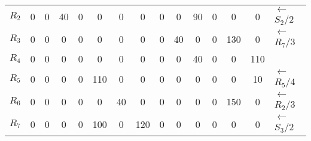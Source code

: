 \documentclass[12pt]{article}
\begin{document}
\begin{enumerate}
\begin{tabular}{|c|c|c|c|c|c|c|c|c|c|c|c|c|c|l}
$R_2$ & 0   & {\color[HTML]{000000} 0}        & {\color[HTML]{000000} 40}       & {\color[HTML]{000000} 0}        & {\color[HTML]{000000} 0}   & {\color[HTML]{000000} 0}   & {\color[HTML]{000000} 0}   & {\color[HTML]{000000} 0}  & {\color[HTML]{000000} 0}   & {\color[HTML]{FE0000} 90} & {\color[HTML]{000000} 0}   & {\color[HTML]{000000} 0}   & {\color[HTML]{000000} 0}   & ${\leftarrow}$ $S_2$/2 \\ \cline{1-14}
$R_3$ & 0   & {\color[HTML]{000000} 0}        & {\color[HTML]{000000} 0}        & {\color[HTML]{000000} 0}        & {\color[HTML]{000000} 0}   & {\color[HTML]{000000} 0}   & {\color[HTML]{000000} 0}   & {\color[HTML]{000000} 0}  & {\color[HTML]{000000} 40}  & {\color[HTML]{000000} 0}  & {\color[HTML]{000000} 0}   & {\color[HTML]{000000} 130} & {\color[HTML]{000000} 0}   & ${\leftarrow}$ $R_7$/3 \\ \cline{1-14}
$R_4$ & 0   & {\color[HTML]{000000} 0}        & {\color[HTML]{000000} 0}        & {\color[HTML]{000000} 0}        & {\color[HTML]{000000} 0}   & {\color[HTML]{000000} 0}   & {\color[HTML]{000000} 0}   & {\color[HTML]{000000} 0}  & {\color[HTML]{000000} 0}   & {\color[HTML]{000000} 40} & {\color[HTML]{000000} 0}   & {\color[HTML]{000000} 0}   & {\color[HTML]{000000} 110} &                        \\ \cline{1-14}
$R_5$ & 0   & {\color[HTML]{000000} 0}        & {\color[HTML]{000000} 0}        & {\color[HTML]{000000} 0}        & {\color[HTML]{000000} 110} & {\color[HTML]{000000} 0}   & {\color[HTML]{000000} 0}   & {\color[HTML]{000000} 0}  & {\color[HTML]{000000} 0}   & {\color[HTML]{000000} 0}  & {\color[HTML]{000000} 0}   & {\color[HTML]{000000} 0}   & {\color[HTML]{000000} 10}  & ${\leftarrow}$ $R_5$/4 \\ \cline{1-14}
$R_6$ & 0   & {\color[HTML]{000000} 0}        & {\color[HTML]{000000} 0}        & {\color[HTML]{000000} 0}        & {\color[HTML]{000000} 0}   & {\color[HTML]{000000} 40}  & {\color[HTML]{000000} 0}   & {\color[HTML]{000000} 0}  & {\color[HTML]{000000} 0}   & {\color[HTML]{000000} 0}  & {\color[HTML]{000000} 0}   & {\color[HTML]{FE0000} 150} & {\color[HTML]{000000} 0}   & ${\leftarrow}$ $R_2$/3 \\ \cline{1-14}
$R_7$ & 0   & {\color[HTML]{000000} 0}        & {\color[HTML]{000000} 0}        & {\color[HTML]{000000} 0}        & {\color[HTML]{000000} 100} & {\color[HTML]{000000} 0}   & {\color[HTML]{000000} 120} & {\color[HTML]{000000} 0}  & {\color[HTML]{000000} 0}   & {\color[HTML]{000000} 0}  & {\color[HTML]{000000} 0}   & {\color[HTML]{000000} 0}   & {\color[HTML]{000000} 0}   & ${\leftarrow}$ $S_3$/2 \\ \cline{1-14}

\end{tabular}
\end{enumerate}
\end{document}
